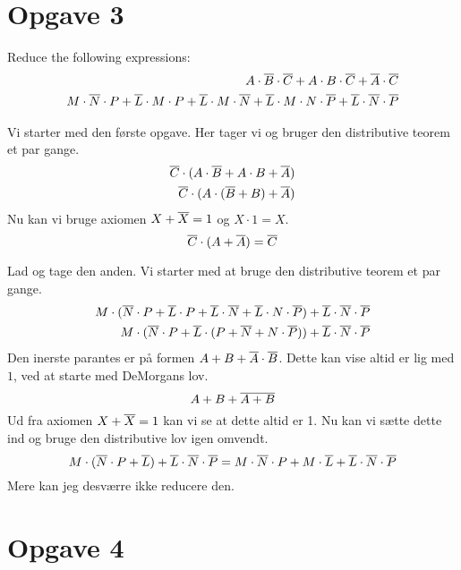 \section{Opgave 3}

\begin{opg}
    Reduce the following expressions:
    \begin{align*}
        A \cdot \overline{B} \cdot \overline{C} + A \cdot B \cdot \overline{C} + \overline{A} \cdot \overline{C} \\
        M \cdot \overline N \cdot P + \overline L \cdot M \cdot P + \overline L \cdot M \cdot \overline N + \overline L \cdot M \cdot N \cdot \overline P + \overline L \cdot \overline N \cdot \overline P
    \end{align*}
\end{opg}

Vi starter med den første opgave.
Her tager vi og bruger den distributive teorem et par gange.
\begin{equation*}
    \begin{split}
        \overline{C} \cdot (A \cdot \overline B + A \cdot B + \overline A) \\
        \overline{C} \cdot (A \cdot (\overline B + B) + \overline A)
    \end{split}
\end{equation*}
Nu kan vi bruge axiomen \(X + \overline X = 1\) og \(X \cdot 1 = X\).
\[
    \overline C \cdot (A + \overline A) = \overline C
\]

Lad og tage den anden.
Vi starter med at bruge den distributive teorem et par gange.
\begin{equation*}
    \begin{split}
        M \cdot (\overline N \cdot P + \overline L \cdot P + \overline L \cdot \overline N + \overline L \cdot N \cdot \overline P) + \overline L \cdot \overline N \cdot \overline P \\
        M \cdot (\overline N \cdot P + \overline L \cdot (P + \overline N + N \cdot \overline P)) + \overline L \cdot \overline N \cdot \overline P
    \end{split}
\end{equation*}
Den inerste parantes er på formen $A + B + \overline A \cdot \overline B$.
Dette kan vise altid er lig med $1$, ved at starte med DeMorgans lov.
\[
    A + B + \overline{A + B}
\]
Ud fra axiomen $X + \overline X = 1$ kan vi se at dette altid er 1.
Nu kan vi sætte dette ind og bruge den distributive lov igen omvendt.
\[
    M \cdot (\overline N \cdot P + \overline L) + \overline L \cdot \overline N \cdot \overline P = M \cdot \overline N \cdot P + M \cdot \overline L + \overline L \cdot \overline N \cdot \overline P
\]
Mere kan jeg desværre ikke reducere den.

\section{Opgave 4}


